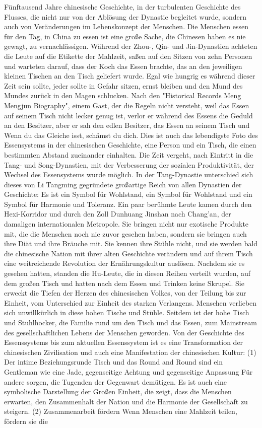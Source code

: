 \par
Fünftausend Jahre chinesische Geschichte, in der turbulenten Geschichte des Flusses, die nicht nur von der Ablösung der Dynastie begleitet wurde, sondern auch von Veränderungen im Lebenskonzept der Menschen. Die Menschen essen für den Tag, in China zu essen ist eine große Sache, die Chinesen haben es nie gewagt, zu vernachlässigen. Während der Zhou-, Qin- und Jin-Dynastien achteten die Leute auf die Etikette der Mahlzeit, saßen auf den Sitzen von zehn Personen und warteten darauf, dass der Koch das Essen brachte, das an den jeweiligen kleinen Tischen an den Tisch geliefert wurde. Egal wie hungrig es während dieser Zeit sein sollte, jeder sollte in Gefahr sitzen, ernst bleiben und den Mund des Mundes zurück in den Magen schlucken. Nach den "Historical Records Meng Mengjun Biography", einem Gast, der die Regeln nicht versteht, weil das Essen auf seinem Tisch nicht lecker genug ist, verlor er während des Essens die Geduld an den Besitzer, aber er sah den edlen Besitzer, das Essen an seinem Tisch und Wenn du das Gleiche isst, schämst du dich. Dies ist auch das lebendigste Foto des Essensystems in der chinesischen Geschichte, eine Person und ein Tisch, die einen bestimmten Abstand zueinander einhalten. Die Zeit vergeht, nach Eintritt in die Tang- und Song-Dynastien, mit der Verbesserung der sozialen Produktivität, der Wechsel des Essensystems wurde möglich. In der Tang-Dynastie unterschied sich dieses von Li Tangming gegründete großartige Reich von allen Dynastien der Geschichte: Es ist ein Symbol für Wohlstand, ein Symbol für Wohlstand und ein Symbol für Harmonie und Toleranz. Ein paar berühmte Leute kamen durch den Hexi-Korridor und durch den Zoll Dunhuang Jinshan nach Chang'an, der damaligen internationalen Metropole. Sie bringen nicht nur exotische Produkte mit, die die Menschen noch nie zuvor gesehen haben, sondern sie bringen auch ihre Diät und ihre Bräuche mit. Sie kennen ihre Stühle nicht, und sie werden bald die chinesische Nation mit ihrer alten Geschichte verändern und auf ihrem Tisch eine weitreichende Revolution der Ernährungskultur auslösen. Nachdem sie es gesehen hatten, standen die Hu-Leute, die in diesen Reihen verteilt wurden, auf dem großen Tisch und hatten nach dem Essen und Trinken keine Skrupel. Sie erweckt die Tiefen der Herzen des chinesischen Volkes, von der Teilung bis zur Einheit, vom Unterschied zur Einheit des starken Verlangens. Menschen verlieben sich unwillkürlich in diese hohen Tische und Stühle. Seitdem ist der hohe Tisch und Stuhlhocker, die Familie rund um den Tisch und das Essen, zum Mainstream des gesellschaftlichen Lebens der Menschen geworden. Von der Geschichte des Essenssystems bis zum aktuellen Essenssystem ist es eine Transformation der chinesischen Zivilisation und auch eine Manifestation der chinesischen Kultur: (1) Der intime Beziehungsrunde Tisch und das Round and Round sind ein Gentleman wie eine Jade, gegenseitige Achtung und gegenseitige Anpassung Für andere sorgen, die Tugenden der Gegenwart demütigen. Es ist auch eine symbolische Darstellung der Großen Einheit, die zeigt, dass die Menschen erwarten, den Zusammenhalt der Nation und die Harmonie der Gesellschaft zu steigern. (2) Zusammenarbeit fördern Wenn Menschen eine Mahlzeit teilen, fördern sie die 